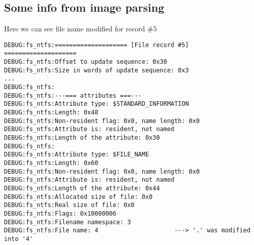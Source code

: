 \documentclass[12pt]{article}
\begin{document}
\subsection{Some info from image parsing}
Here we can see file name modified for record \#5
\begin{verbatim}
DEBUG:fs_ntfs:==================== [File record #5] ====================
DEBUG:fs_ntfs:Offset to update sequence: 0x30
DEBUG:fs_ntfs:Size in words of update sequence: 0x3
...
DEBUG:fs_ntfs:
DEBUG:fs_ntfs:---=== attributes ===---
DEBUG:fs_ntfs:Attribute type: $STANDARD_INFORMATION
DEBUG:fs_ntfs:Length: 0x48
DEBUG:fs_ntfs:Non-resident flag: 0x0, name length: 0x0
DEBUG:fs_ntfs:Attribute is: resident, not named
DEBUG:fs_ntfs:Length of the attribute: 0x30
DEBUG:fs_ntfs:
DEBUG:fs_ntfs:Attribute type: $FILE_NAME
DEBUG:fs_ntfs:Length: 0x60
DEBUG:fs_ntfs:Non-resident flag: 0x0, name length: 0x0
DEBUG:fs_ntfs:Attribute is: resident, not named
DEBUG:fs_ntfs:Length of the attribute: 0x44
DEBUG:fs_ntfs:Allocated size of file: 0x0
DEBUG:fs_ntfs:Real size of file: 0x0
DEBUG:fs_ntfs:Flags: 0x10000006
DEBUG:fs_ntfs:Filename namespace: 3
DEBUG:fs_ntfs:File name: 4                     ---> '.' was modified into '4'

\end{verbatim}
\end{document}
